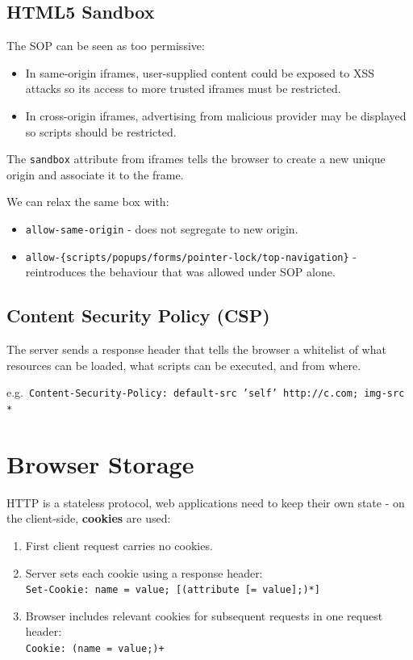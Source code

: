 \documentclass[11pt]{article}
\begin{document}
\subsection{HTML5 Sandbox}
The SOP can be seen as too permissive:
\begin{itemize}
  \item In same-origin iframes, user-supplied content could be exposed to XSS attacks so its access to more trusted iframes must be restricted.
  \item In cross-origin iframes, advertising from malicious provider may be displayed so scripts should be restricted.
\end{itemize}

The \texttt{sandbox} attribute from iframes tells the browser to create a new unique origin and associate it to the frame.

We can relax the same box with:
\begin{itemize}
  \item \texttt{allow-same-origin} - does not segregate to new origin.
  \item \texttt{allow-\{scripts/popups/forms/pointer-lock/top-navigation\}} - reintroduces the behaviour that was allowed under SOP alone.
\end{itemize}

\subsection{Content Security Policy (CSP)}
The server sends a response header that tells the browser a whitelist of what resources can be loaded, what scripts can be executed, and from where.

e.g.\ \texttt{Content-Security-Policy: default-src 'self' http://c.com; img-src *}

\section{Browser Storage}
HTTP is a stateless protocol, web applications need to keep their own state - on the client-side, \textbf{cookies} are used:
\begin{enumerate}
  \item First client request carries no cookies.
  \item Server sets each cookie using a response header: \\
    \texttt{Set-Cookie: name = value; [(attribute [= value];)*]}
  \item Browser includes relevant cookies for subsequent requests in one request header: \\
    \texttt{Cookie: (name = value;)+}
\end{enumerate}
\end{document}
